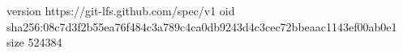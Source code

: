 version https://git-lfs.github.com/spec/v1
oid sha256:08c7d3f2b55ea76f484c3a789c4ca0db9243d4c3cec72bbeaac1143ef00ab0e1
size 524384
